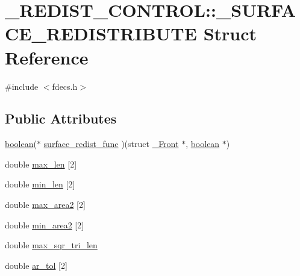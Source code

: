 \hypertarget{struct___r_e_d_i_s_t___c_o_n_t_r_o_l_1_1___s_u_r_f_a_c_e___r_e_d_i_s_t_r_i_b_u_t_e}{}\section{\+\_\+\+R\+E\+D\+I\+S\+T\+\_\+\+C\+O\+N\+T\+R\+OL\+:\+:\+\_\+\+S\+U\+R\+F\+A\+C\+E\+\_\+\+R\+E\+D\+I\+S\+T\+R\+I\+B\+U\+TE Struct Reference}
\label{struct___r_e_d_i_s_t___c_o_n_t_r_o_l_1_1___s_u_r_f_a_c_e___r_e_d_i_s_t_r_i_b_u_t_e}


{\ttfamily \#include $<$fdecs.\+h$>$}

\subsection*{Public Attributes}
\begin{DoxyCompactItemize}
\item 
\hyperlink{cdecs_8h_ad048433382a936258fb49e2ec4f148e1}{boolean}($\ast$ \hyperlink{struct___r_e_d_i_s_t___c_o_n_t_r_o_l_1_1___s_u_r_f_a_c_e___r_e_d_i_s_t_r_i_b_u_t_e_a4de3df77c79611597fee4d9658381d23}{surface\+\_\+redist\+\_\+func} )(struct \hyperlink{struct___front}{\+\_\+\+Front} $\ast$, \hyperlink{cdecs_8h_ad048433382a936258fb49e2ec4f148e1}{boolean} $\ast$)
\item 
double \hyperlink{struct___r_e_d_i_s_t___c_o_n_t_r_o_l_1_1___s_u_r_f_a_c_e___r_e_d_i_s_t_r_i_b_u_t_e_a42a32b8561193afeeaa571056c1d5143}{max\+\_\+len} \mbox{[}2\mbox{]}
\item 
double \hyperlink{struct___r_e_d_i_s_t___c_o_n_t_r_o_l_1_1___s_u_r_f_a_c_e___r_e_d_i_s_t_r_i_b_u_t_e_a66268af13f291125bb551b0921d86984}{min\+\_\+len} \mbox{[}2\mbox{]}
\item 
double \hyperlink{struct___r_e_d_i_s_t___c_o_n_t_r_o_l_1_1___s_u_r_f_a_c_e___r_e_d_i_s_t_r_i_b_u_t_e_a8fe0616a2dc02dcfaa2f776e0929f7b8}{max\+\_\+area2} \mbox{[}2\mbox{]}
\item 
double \hyperlink{struct___r_e_d_i_s_t___c_o_n_t_r_o_l_1_1___s_u_r_f_a_c_e___r_e_d_i_s_t_r_i_b_u_t_e_acc52a1aa690a0f81b08ab6e0fc444aa3}{min\+\_\+area2} \mbox{[}2\mbox{]}
\item 
double \hyperlink{struct___r_e_d_i_s_t___c_o_n_t_r_o_l_1_1___s_u_r_f_a_c_e___r_e_d_i_s_t_r_i_b_u_t_e_a9884635edea5ea2033bfe8ea5851c49c}{max\+\_\+sqr\+\_\+tri\+\_\+len}
\item 
double \hyperlink{struct___r_e_d_i_s_t___c_o_n_t_r_o_l_1_1___s_u_r_f_a_c_e___r_e_d_i_s_t_r_i_b_u_t_e_a3a08c8d1d681c8114629aa5b06af183c}{ar\+\_\+tol} \mbox{[}2\mbox{]}
\end{DoxyCompactItemize}


